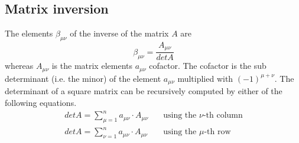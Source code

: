 \subsection{Matrix inversion}

The elements $\beta_{\mu\nu}$ of the inverse of the matrix $A$ are
\begin{equation}
\beta_{\mu\nu} = \frac{A_{\mu\nu}}{det A}
\end{equation}
whereas $A_{\mu\nu}$ is the matrix elements $a_{\mu\nu}$ cofactor.
The cofactor is the sub determinant (i.e. the minor) of the element
$a_{\mu\nu}$ multiplied with $(-1)^{\mu + \nu}$.  The determinant of a
square matrix can be recursively computed by either of the following
equations.
\begin{align}
det A = \sum_{\mu = 1}^{n} a_{\mu\nu}\cdot A_{\mu\nu}
\quad &\text{using the $\nu$-th column}\\
det A = \sum_{\nu = 1}^{n} a_{\mu\nu}\cdot A_{\mu\nu}
\quad &\text{using the $\mu$-th row}
\end{align}

